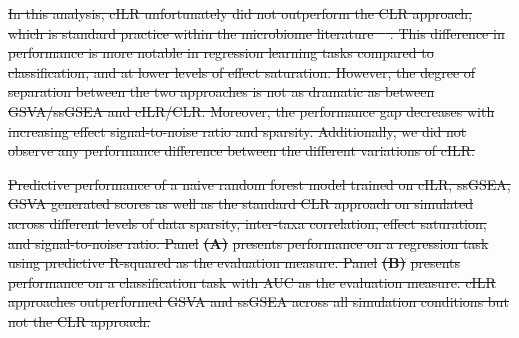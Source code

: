 \documentclass[10pt,letterpaper]{article}
\providecommand{\DIFdeltex}[1]{{\protect\color{red}\sout{#1}}}                      %
\providecommand{\DIFdelbegin}{} %
\providecommand{\DIFdelFL}[1]{\DIFdel{#1}} %
\providecommand{\DIFdel}[1]{\texorpdfstring{\DIFdeltex{#1}}{}} %
\newcommand{\DIFscaledelfig}{0.5}
\newlength{\DIFdelgraphicswidth} %
\newlength{\DIFdelgraphicsheight} %
\newcommand{\DIFdelincludegraphics}[2][]{%
\sbox{\DIFdelgraphicsbox}{\DIFOincludegraphics[#1]{#2}}%
\settoboxwidth{\DIFdelgraphicswidth}{\DIFdelgraphicsbox} %
\settoboxtotalheight{\DIFdelgraphicsheight}{\DIFdelgraphicsbox} %
\scalebox{\DIFscaledelfig}{%
\parbox[b]{\DIFdelgraphicswidth}{\usebox{\DIFdelgraphicsbox}\\[-\baselineskip] \rule{\DIFdelgraphicswidth}{0em}}\llap{\resizebox{\DIFdelgraphicswidth}{\DIFdelgraphicsheight}{%
\setlength{\unitlength}{\DIFdelgraphicswidth}%
\begin{picture}(1,1)%
\thicklines\linethickness{2pt} %
{\color[rgb]{1,0,0}\put(0,0){\framebox(1,1){}}}%
{\color[rgb]{1,0,0}\put(0,0){\line( 1,1){1}}}%
{\color[rgb]{1,0,0}\put(0,1){\line(1,-1){1}}}%
\end{picture}%
}\hspace*{3pt}}} %
} %
\DeclareRobustCommand{\DIFdelbegin}{\DIFOdelbegin \let\includegraphics\DIFdelincludegraphics} %
\begin{document}
\DIFdelbegin \DIFdel{In this analysis, cILR unfortunately did not outperform the CLR approach, which is standard practice within the microbiome literature \mbox{%
\cite{gloor2017}}\hspace{0pt}%
. This difference in performance is more notable in regression learning tasks compared to classification, and at lower levels of effect saturation. However, the degree of separation between the two approaches is not as dramatic as between GSVA/ssGSEA and cILR/CLR. Moreover, the performance gap decreases with increasing effect signal-to-noise ratio and sparsity. Additionally, we did not observe any performance difference between the different variations of cILR. 
}%

{%
\DIFdelFL{Predictive performance of a naive random forest model trained on cILR, ssGSEA, GSVA generated scores as well as the standard CLR approach on simulated across different levels of data sparsity, inter-taxa correlation, effect saturation, and signal-to-noise ratio. Panel }\textbf{\DIFdelFL{(A)}} %
\DIFdelFL{presents performance on a regression task using predictive R-squared as the evaluation measure. Panel }\textbf{\DIFdelFL{(B)}} %
\DIFdelFL{presents performance on a classification task with AUC as the evaluation measure. cILR approaches outperformed GSVA and ssGSEA across all simulation conditions but not the CLR approach.}}

\end{document}
